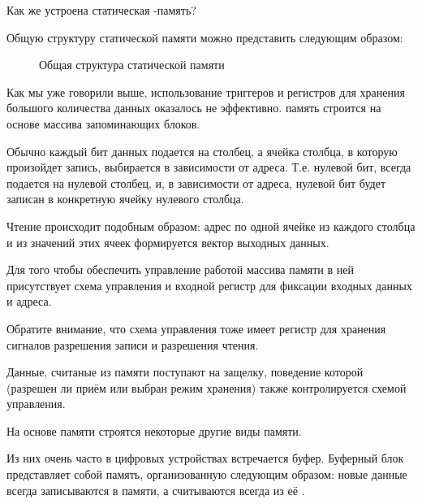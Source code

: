 \par{Как же устроена статическая -память?}

\par{Общую структуру статической памяти можно представить следующим образом:}

\begin{figure}[H]
	\centering
	\def\svgwidth{\columnwidth}
	
	\caption{Общая структура статической памяти}
\end{figure}

\par{Как мы уже говорили выше, использование триггеров и регистров для хранения большого количества данных оказалось не эффективно.  память строится на основе массива запоминающих блоков.}

\par{Обычно каждый бит данных подается на столбец, а ячейка столбца, в которую произойдет запись, выбирается в зависимости от адреса. Т.е. нулевой бит, всегда подается на нулевой столбец, и, в зависимости от адреса, нулевой бит будет записан в конкретную ячейку нулевого столбца.}

\par{Чтение происходит подобным образом: адрес  по одной ячейке из каждого столбца и из значений этих ячеек формируется вектор выходных данных.}

\par{Для того чтобы обеспечить управление работой массива памяти в ней присутствует схема управления и входной регистр для фиксации входных данных и адреса.}

\par{Обратите внимание, что схема управления тоже имеет регистр для хранения сигналов разрешения записи и разрешения чтения.}

\par{Данные, считаные из памяти поступают на защелку, поведение которой (разрешен ли приём или выбран режим хранения) также контролируется схемой управления.}

\par{На основе  памяти строятся некоторые другие виды памяти.}

\par{Из них очень часто в цифровых устройствах встречается буфер. Буферный блок представляет собой память, организованную следующим образом: новые данные всегда записываются в  памяти, а считываются всегда из её .}


